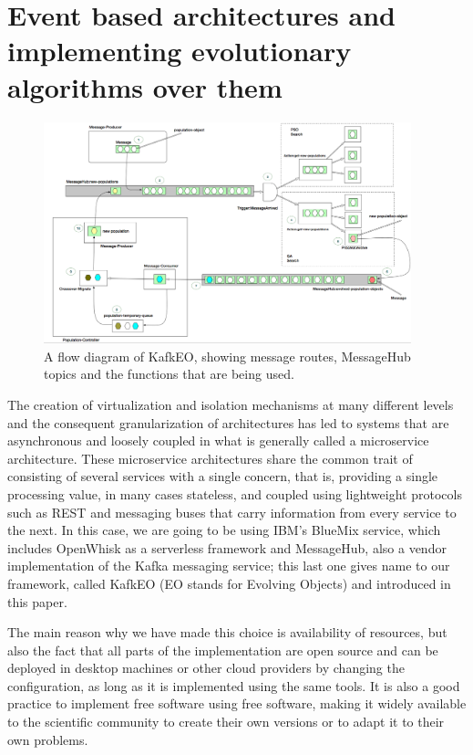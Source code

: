 \documentclass[sigconf]{acmart}
\begin{document}
\section{Event based architectures and implementing evolutionary
  algorithms over them}
\label{sec:methods}
%
\begin{figure}[h!tbp]
\includegraphics[width=0.95\textwidth]{img/kafkEO.png}
\caption{A flow diagram of KafkEO, showing message routes, MessageHub
  topics and the functions that are being used.}
\label{fig:kafkeo2}
\end{figure}
%
The creation of virtualization and isolation mechanisms at many
different levels and the consequent granularization of architectures
has led to systems that are asynchronous and loosely coupled in what
is generally called a microservice architecture. These microservice
architectures share the common trait of consisting of several services
with a single concern, that is, providing a single processing value,
in many cases stateless, and coupled using lightweight protocols such
as REST and messaging buses that carry information from every service
to the next. In this case, we are going to be using IBM's BlueMix
service, which includes OpenWhisk as a serverless framework and
MessageHub, also a vendor implementation of the Kafka messaging
service; this last one gives name to our framework, called KafkEO (EO
stands for Evolving Objects) and introduced in this paper.

The main reason why we have made this choice is availability of
resources, but also
the fact that all parts of the implementation are open source and can
be deployed in desktop machines or other cloud providers by changing
the configuration, as long as it is implemented using the same tools. It is also a good practice to implement free
software using free software, making it widely available to the
scientific community to create their own versions or to adapt it to
their own problems.
\end{document}
